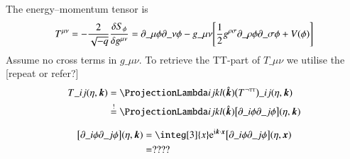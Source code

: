 

\begin{draft}
    \subsection*{}
        The energy--momentum tensor is 
        \begin{equation}
            T\^{\mu\nu}= -\frac{2}{\sqrt{-q}}\frac{\delta S_\phi}{\delta g\^{\mu\nu}} = \partial\_\mu \phi \partial\_\nu \phi - g\_{\mu\nu}\bclosed{\frac{1}{2}g\^{\rho \sigma}\partial\_\rho  \phi \partial\_\sigma \phi + V(\phi) }
        \end{equation}
        \blahblah Assume no cross terms in $g\_{\mu\nu}$. To retrieve the TT-part of $T\_{\mu\nu}$ we utilise the [repeat or refer?]
        \begin{equation}
            \begin{split}
                T\_{ij}(\eta, \vec{k}) &= \Lam{ij}{kl}(\hat{\vec{k}}) \pclosed{T^{\lnot \text{{\tiny{TT}}}} }\_{ij}(\eta, \vec{k}) \\ %
                &\stackrel{!}{=} \Lam{ij}{kl}(\hat{\vec{k}}) \bclosed{\partial\_i \phi \partial\_j \phi }(\eta, \vec{k}) 
            \end{split}
        \end{equation}

        \begin{equation}
            \begin{split}
                \bclosed{\partial\_i \phi \partial\_j \phi }(\eta, \vec{k}) &= \integ[3]{x} \eu[\im \vec{k}\cdot \vec{x}] \bclosed{\partial\_i \phi  \partial\_j \phi }(\eta, \vec{x}) \\
                &= ????
            \end{split}
        \end{equation}




\end{draft}





